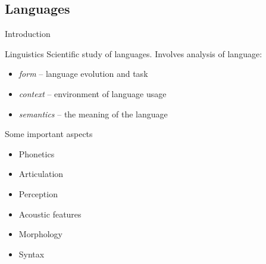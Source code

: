 \documentclass{beamer}
\begin{document}
\subsection{Languages}


\begin{frame}{Introduction}

\begin{block}{Linguistics}
Scientific study of languages. Involves analysis of language:
\begin{itemize}
\item \textit{form} -- language evolution and task
\item \textit{context} -- environment of language usage
\item \textit{semantics} -- the meaning of the language
\end{itemize}
\end{block}

\begin{block}{Some important aspects}
\begin{itemize}
\item Phonetics
\item Articulation
\item Perception
\item Acoustic features
\item Morphology
\item Syntax
\end{itemize}
\end{block}

\end{frame}

\end{document}
